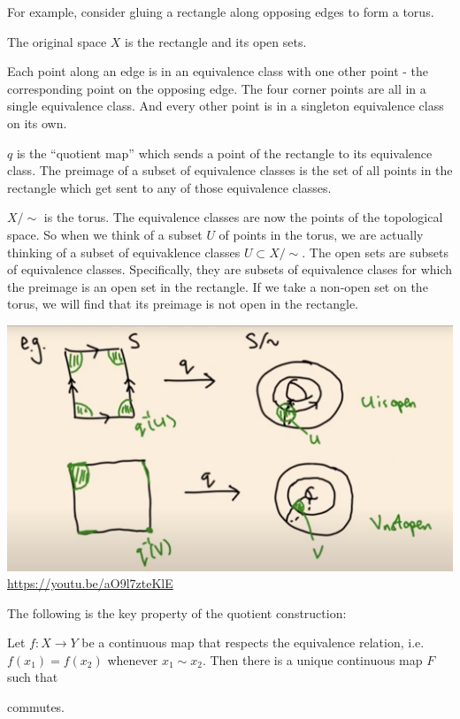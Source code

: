 \begin{example}
  For example, consider gluing a rectangle along opposing edges to form a torus.

  The original space $X$ is the rectangle and its open sets.

  Each point along an edge is in an equivalence class with one other point - the corresponding
  point on the opposing edge. The four corner points are all in a single equivalence class. And
  every other point is in a singleton equivalence class on its own.

  $q$ is the ``quotient map​'' which sends a point of the rectangle to its equivalence class. The
  preimage of a subset of equivalence classes is the set of all points in the rectangle which get
  sent to any of those equivalence classes.

  $X/{\sim}$ is the torus. The equivalence classes are now the points of the topological space. So
  when we think of a subset $U$ of points in the torus, we are actually thinking of a subset of
  equivaklence classes $U \subset X/{\sim}$. The open sets are subsets of equivalence classes.
  Specifically, they are subsets of equivalence clases for which the preimage is an open set in the
  rectangle. If we take a non-open set on the torus, we will find that its preimage is not open in
  the rectangle.

  \begin{mdframed}
    \includegraphics[width=400pt]{img/analysis--berkeley-202a-topology-f3b4.png}
    \url{https://youtu.be/aO9l7zteKlE}
  \end{mdframed}
\end{example}

The following is the key property of the quotient construction:

\begin{example}
  Let $f: X \to Y$ be a continuous map that respects the equivalence relation,
  i.e. $f(x_1) = f(x_2)$ whenever $x_1 \sim x_2$. Then there is a unique continuous map $F$ such
  that
  commutes.
\end{example}


